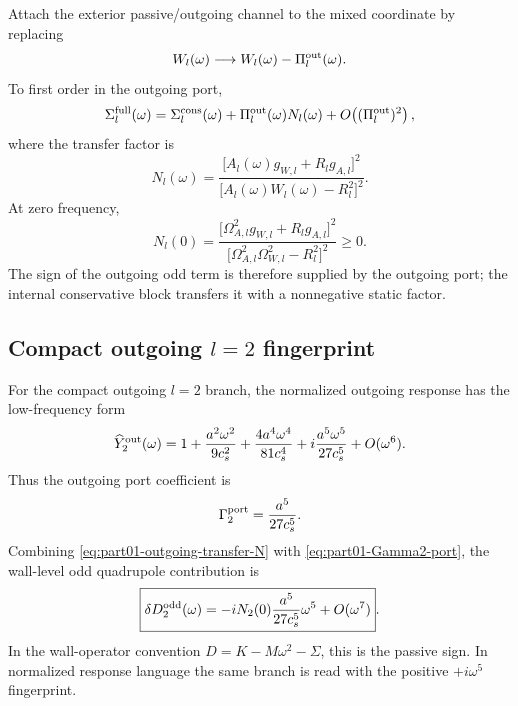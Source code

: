 Attach the exterior passive/outgoing channel to the mixed coordinate by replacing
\begin{equation}
W_l(\omega)\longrightarrow W_l(\omega)-\Pi_l^{\rm out}(\omega).
\end{equation}
To first order in the outgoing port,
\begin{equation}
\Sigma_l^{\rm full}(\omega)
=
\Sigma_l^{\rm cons}(\omega)+\Pi_l^{\rm out}(\omega)N_l(\omega)
+
O\!\left((\Pi_l^{\rm out})^2\right),
\end{equation}
where the transfer factor is
\begin{equation}
\label{eq:part01-outgoing-transfer-N}
\boxed{
N_l(\omega)
=
\frac{\bigl[A_l(\omega)g_{W,l}+R_lg_{A,l}\bigr]^2}
{\bigl[A_l(\omega)W_l(\omega)-R_l^2\bigr]^2}}.
\end{equation}
At zero frequency,
\begin{equation}
\label{eq:part01-N-zero-positive}
\boxed{
N_l(0)
=
\frac{\bigl[\Omega_{A,l}^2g_{W,l}+R_lg_{A,l}\bigr]^2}
{\bigl[\Omega_{A,l}^2\Omega_{W,l}^2-R_l^2\bigr]^2}
\ge0}.
\end{equation}
The sign of the outgoing odd term is therefore supplied by the outgoing port; the internal conservative block transfers it with a nonnegative static factor.

\subsection{Compact outgoing \texorpdfstring{\(l=2\)}{l=2} fingerprint}
\label{subsec:part01-l2-outgoing-fingerprint}

For the compact outgoing \(l=2\) branch, the normalized outgoing response has the low-frequency form
\begin{equation}
\label{eq:part01-l2-fingerprint}
\widehat Y_2^{\rm out}(\omega)
=
1+\frac{a^2\omega^2}{9c_s^2}
+\frac{4a^4\omega^4}{81c_s^4}
+i\frac{a^5\omega^5}{27c_s^5}
+O(\omega^6).
\end{equation}
Thus the outgoing port coefficient is
\begin{equation}
\label{eq:part01-Gamma2-port}
\Gamma_2^{\rm port}=\frac{a^5}{27c_s^5}.
\end{equation}
Combining \eqref{eq:part01-outgoing-transfer-N} with \eqref{eq:part01-Gamma2-port}, the wall-level odd quadrupole contribution is
\begin{equation}
\label{eq:part01-wall-odd-quadrupole}
\boxed{
\delta D_2^{\rm odd}(\omega)
=
-iN_2(0)\frac{a^5}{27c_s^5}\omega^5+O(\omega^7)}.
\end{equation}
In the wall-operator convention \(D=K-M\omega^2-\Sigma\), this is the passive sign.  In normalized response language the same branch is read with the positive \(+i\omega^5\) fingerprint.

